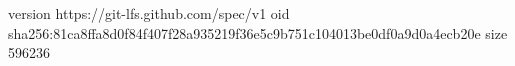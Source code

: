 version https://git-lfs.github.com/spec/v1
oid sha256:81ca8ffa8d0f84f407f28a935219f36e5c9b751c104013be0df0a9d0a4ecb20e
size 596236

